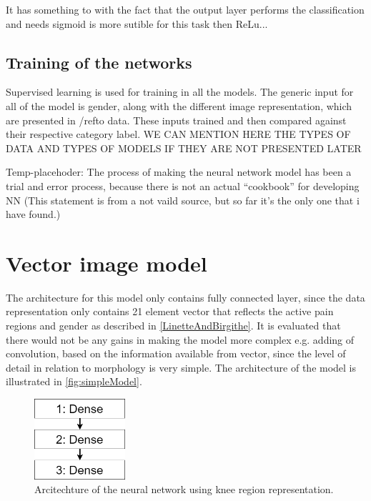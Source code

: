 It has something to with the fact that the output layer performs the classification and needs sigmoid is more sutible for this task then ReLu...   


\subsection{Training of the networks}
Supervised learning is used for training in all the models. The generic input for all of the model is gender, along with the different image representation, which are presented in /ref{to data}. These inputs trained and then compared against their respective category label.  WE CAN MENTION HERE THE TYPES OF DATA AND TYPES OF MODELS IF THEY ARE NOT PRESENTED LATER

Temp-placehoder:
The process of making the neural network model has been a trial and error process, because there is not an actual “cookbook” for developing NN (This statement is from a not vaild source, but so far it’s the only one that i have found.) \citep{Goodfellow2016}

\section{Vector image model}\label{sec:SimpleRepModel}
The architecture for this model only contains fully connected layer, since the data representation only contains 21 element vector that reflects the active pain regions and gender as described in \autoref{LinetteAndBirgithe}. It is evaluated that there would not be any gains in making the model more complex e.g. adding of convolution, based on the information available from vector, since the level of detail in relation to morphology is very simple.
The architecture of the model is illustrated in \autoref{fig:simpleModel}.

\begin{figure} [H]
\centering
\includegraphics[width=0.3\textwidth]{figures/simpleModel}
\caption{Arcitechture of the neural network using knee region representation.}
\label{fig:simpleModel} 
\end{figure}

